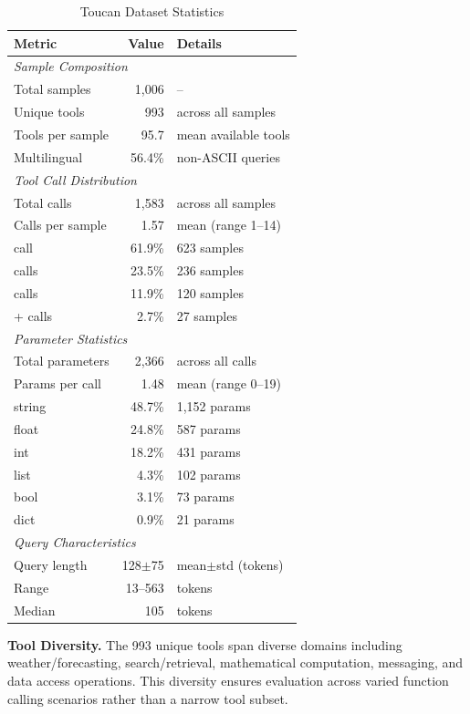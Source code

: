 \documentclass{article}
\theoremstyle{plain}
\theoremstyle{definition}
\begin{document}
\begin{table}[h]
\centering
\caption{Toucan Dataset Statistics}
\label{tab:toucan-dataset-stats}
\scriptsize
\begin{tabular}{@{}lrl@{}}
\toprule
\textbf{Metric} & \textbf{Value} & \textbf{Details} \\
\midrule
\multicolumn{3}{l}{\textit{Sample Composition}} \\
Total samples & 1,006 & -- \\
Unique tools & 993 & across all samples \\
Tools per sample & 95.7 & mean available tools \\
Multilingual & 56.4\% & non-ASCII queries \\
\midrule
\multicolumn{3}{l}{\textit{Tool Call Distribution}} \\
Total calls & 1,583 & across all samples \\
Calls per sample & 1.57 & mean (range 1--14) \\
\quad 1 call & 61.9\% & 623 samples \\
\quad 2 calls & 23.5\% & 236 samples \\
\quad 3 calls & 11.9\% & 120 samples \\
\quad 4+ calls & 2.7\% & 27 samples \\
\midrule
\multicolumn{3}{l}{\textit{Parameter Statistics}} \\
Total parameters & 2,366 & across all calls \\
Params per call & 1.48 & mean (range 0--19) \\
\quad string & 48.7\% & 1,152 params \\
\quad float & 24.8\% & 587 params \\
\quad int & 18.2\% & 431 params \\
\quad list & 4.3\% & 102 params \\
\quad bool & 3.1\% & 73 params \\
\quad dict & 0.9\% & 21 params \\
\midrule
\multicolumn{3}{l}{\textit{Query Characteristics}} \\
Query length & 128$\pm$75 & mean$\pm$std (tokens) \\
\quad Range & 13--563 & tokens \\
\quad Median & 105 & tokens \\
\bottomrule
\end{tabular}
\end{table}

\textbf{Tool Diversity.} The 993 unique tools span diverse domains including weather/forecasting, search/retrieval, mathematical computation, messaging, and data access operations. This diversity ensures evaluation across varied function calling scenarios rather than a narrow tool subset.
\end{document}
